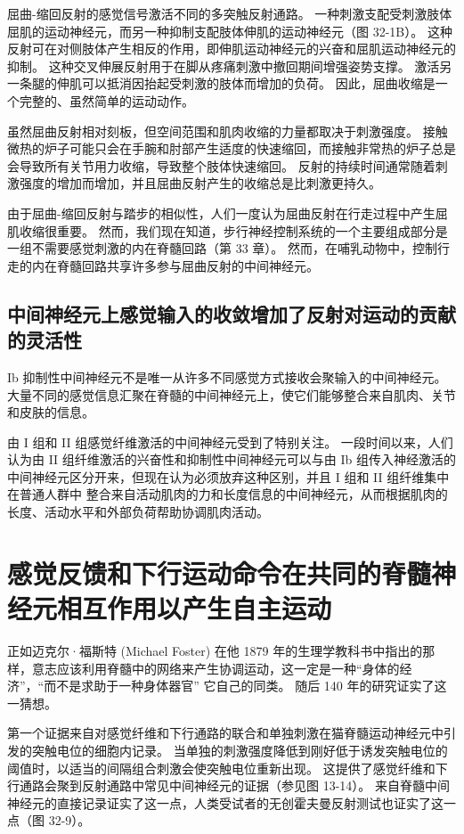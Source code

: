 屈曲-缩回反射的感觉信号激活不同的多突触反射通路。 一种刺激支配受刺激肢体屈肌的运动神经元，而另一种抑制支配肢体伸肌的运动神经元（图 32-1B）。 这种反射可在对侧肢体产生相反的作用，即伸肌运动神经元的兴奋和屈肌运动神经元的抑制。 这种交叉伸展反射用于在脚从疼痛刺激中撤回期间增强姿势支撑。 激活另一条腿的伸肌可以抵消因抬起受刺激的肢体而增加的负荷。 因此，屈曲收缩是一个完整的、虽然简单的运动动作。

虽然屈曲反射相对刻板，但空间范围和肌肉收缩的力量都取决于刺激强度。 接触微热的炉子可能只会在手腕和肘部产生适度的快速缩回，而接触非常热的炉子总是会导致所有关节用力收缩，导致整个肢体快速缩回。 反射的持续时间通常随着刺激强度的增加而增加，并且屈曲反射产生的收缩总是比刺激更持久。

由于屈曲-缩回反射与踏步的相似性，人们一度认为屈曲反射在行走过程中产生屈肌收缩很重要。 然而，我们现在知道，步行神经控制系统的一个主要组成部分是一组不需要感觉刺激的内在脊髓回路（第 33 章）。 然而，在哺乳动物中，控制行走的内在脊髓回路共享许多参与屈曲反射的中间神经元。

\subsection{中间神经元上感觉输入的收敛增加了反射对运动的贡献的灵活性}

Ib 抑制性中间神经元不是唯一从许多不同感觉方式接收会聚输入的中间神经元。 大量不同的感觉信息汇聚在脊髓的中间神经元上，使它们能够整合来自肌肉、关节和皮肤的信息。

由 I 组和 II 组感觉纤维激活的中间神经元受到了特别关注。 一段时间以来，人们认为由 II 组纤维激活的兴奋性和抑制性中间神经元可以与由 Ib 组传入神经激活的中间神经元区分开来，但现在认为必须放弃这种区别，并且 I 组和 II 组纤维集中在普通人群中 整合来自活动肌肉的力和长度信息的中间神经元，从而根据肌肉的长度、活动水平和外部负荷帮助协调肌肉活动。

\section{感觉反馈和下行运动命令在共同的脊髓神经元相互作用以产生自主运动}
正如迈克尔·福斯特 (Michael Foster) 在他 1879 年的生理学教科书中指出的那样，意志应该利用脊髓中的网络来产生协调运动，这一定是一种“身体的经济”，“而不是求助于一种身体器官” 它自己的同类。 随后 140 年的研究证实了这一猜想。

第一个证据来自对感觉纤维和下行通路的联合和单独刺激在猫脊髓运动神经元中引发的突触电位的细胞内记录。 当单独的刺激强度降低到刚好低于诱发突触电位的阈值时，以适当的间隔组合刺激会使突触电位重新出现。 这提供了感觉纤维和下行通路会聚到反射通路中常见中间神经元的证据（参见图 13-14）。 来自脊髓中间神经元的直接记录证实了这一点，人类受试者的无创霍夫曼反射测试也证实了这一点（图 32-9）。

